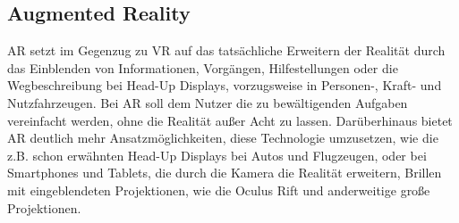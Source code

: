 \subsection*{Augmented Reality}
\ac{AR} setzt im Gegenzug zu \ac{VR} auf das tatsächliche Erweitern der Realität durch das Einblenden von Informationen, Vorgängen, Hilfestellungen
oder die Wegbeschreibung bei Head-Up Displays, vorzugsweise in Personen-, Kraft- und Nutzfahrzeugen. 
Bei \acs{AR} soll dem Nutzer die zu bewältigenden Aufgaben vereinfacht 
werden, ohne die Realität außer Acht zu lassen. Darüberhinaus bietet \acl{AR} deutlich mehr Ansatzmöglichkeiten, diese Technologie 
umzusetzen, wie die z.B. schon erwähnten Head-Up Displays bei Autos und Flugzeugen, oder bei Smartphones und Tablets, die durch die Kamera 
die Realität erweitern, Brillen mit eingeblendeten Projektionen, wie die Oculus Rift und anderweitige große Projektionen. 
